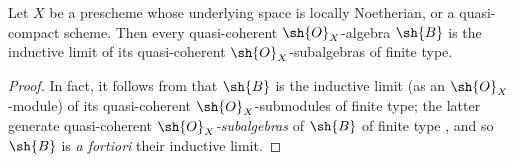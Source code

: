 \begin{proposition}[9.6.6]
\label{I.9.6.6}
Let $X$ be a prescheme whose underlying space is locally Noetherian, or a quasi-compact scheme.
Then every quasi-coherent $\sh{O}_X$-algebra $\sh{B}$ is the inductive limit of its quasi-coherent $\sh{O}_X$-subalgebras of finite type.
\end{proposition}

\begin{proof}
In fact, it follows from  that $\sh{B}$ is the inductive limit (as an $\sh{O}_X$-module) of its quasi-coherent $\sh{O}_X$-submodules of finite type; the latter generate quasi-coherent \emph{$\sh{O}_X$-subalgebras} of $\sh{B}$ of finite type , and so $\sh{B}$ is \emph{a fortiori} their inductive limit.
\end{proof}
